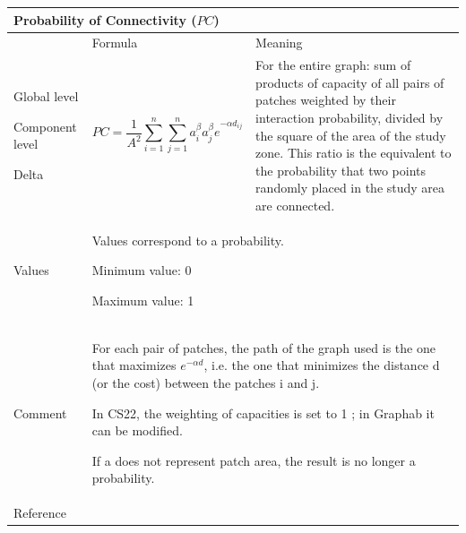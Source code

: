 \documentclass{article}
\begin{document}
\begin{table}[H]
\begin{tabular}{|m{3.24cm}|m{4.4810004cm}m{7.924cm}|}
\hline
\multicolumn{3}{|m{16.044998cm}|}{Probability of Connectivity ($PC$)}\\\hline
 &
\multicolumn{1}{m{4.4810004cm}|}{Formula} &
Meaning\\\hline
Global level 

Component level

Delta &
\multicolumn{1}{m{4.4810004cm}|}{\begin{equation*}
\mathit{PC}=\frac{1}{{A}^{2}}\sum _{i=1}^{n}{\sum
_{j=1}^{n}{{a}_{i}^{\beta }}}{{a}_{j}^{\beta }e}^{-\alpha
{d}_{\mathit{ij}}}
\end{equation*}
} &
For the entire graph: sum of products of capacity of all pairs of patches weighted by their interaction probability, divided by the square of the area of the study zone. This ratio is the equivalent to the probability that two points randomly placed in the study area are connected.\\\hline
Values &
\multicolumn{2}{m{12.6050005cm}|}{Values correspond to a probability.
	
Minimum value: 0

Maximum value: 1
}\\\hline
Comment &
\multicolumn{2}{m{12.6050005cm}|}{For each pair of patches, the path of
the graph used is the one that maximizes ${e}^{-\mathit{\alpha d}}$,
i.e. the one that minimizes the distance d (or the cost) between the
patches i and j.

In CS22, the weighting of capacities is set to 1 ; in Graphab it can be
modified. 

If a does not represent patch area, the result is no longer a
probability.
}\\\hline
Reference &
\multicolumn{2}{m{12.6050005cm}|}{
\cite{Saura2007}
}\\\hline
\end{tabular}
\end{table}
\end{document}
